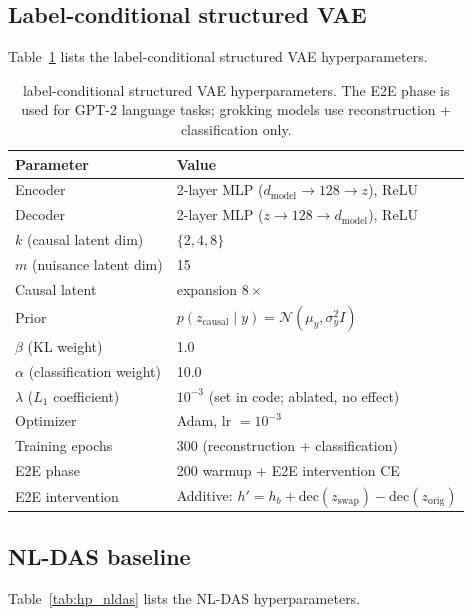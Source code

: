 \subsection{Label-conditional structured VAE}

Table~\ref{tab:hp_pisae} lists the label-conditional structured VAE hyperparameters.

\begin{table}[H]
\centering
\small
\begin{tabular}{ll}
\toprule
\textbf{Parameter} & \textbf{Value} \\
\midrule
Encoder & 2-layer MLP ($d_\text{model} \to 128 \to z$), ReLU \\
Decoder & 2-layer MLP ($z \to 128 \to d_\text{model}$), ReLU \\
$k$ (causal latent dim) & $\{2, 4, 8\}$ \\
$m$ (nuisance latent dim) & 15 \\
Causal latent & expansion $8\times$ \\
Prior & $p(z_\text{causal} \mid y) = \mathcal{N}(\mu_y, \sigma_y^2 I)$ \\
$\beta$ (KL weight) & 1.0 \\
$\alpha$ (classification weight) & 10.0 \\
$\lambda$ ($L_1$ coefficient) & $10^{-3}$ (set in code; ablated, no effect) \\
Optimizer & Adam, lr $= 10^{-3}$ \\
Training epochs & 300 (reconstruction + classification) \\
E2E phase & 200 warmup + E2E intervention CE \\
E2E intervention & Additive: $h' = h_b + \text{dec}(z_\text{swap}) - \text{dec}(z_\text{orig})$ \\
\bottomrule
\end{tabular}
\caption{label-conditional structured VAE hyperparameters. The E2E phase is used for
GPT-2 language tasks; grokking models use reconstruction + classification only.}
\label{tab:hp_pisae}
\end{table}

\subsection{NL-DAS baseline}

Table~\ref{tab:hp_nldas} lists the NL-DAS hyperparameters.

